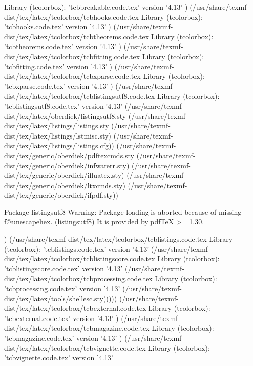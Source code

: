 Library (tcolorbox): 'tcbbreakable.code.tex' version '4.13'
) (/usr/share/texmf-dist/tex/latex/tcolorbox/tcbhooks.code.tex
Library (tcolorbox): 'tcbhooks.code.tex' version '4.13'
) (/usr/share/texmf-dist/tex/latex/tcolorbox/tcbtheorems.code.tex
Library (tcolorbox): 'tcbtheorems.code.tex' version '4.13'
) (/usr/share/texmf-dist/tex/latex/tcolorbox/tcbfitting.code.tex
Library (tcolorbox): 'tcbfitting.code.tex' version '4.13'
) (/usr/share/texmf-dist/tex/latex/tcolorbox/tcbxparse.code.tex
Library (tcolorbox): 'tcbxparse.code.tex' version '4.13'
) (/usr/share/texmf-dist/tex/latex/tcolorbox/tcblistingsutf8.code.tex
Library (tcolorbox): 'tcblistingsutf8.code.tex' version '4.13'
(/usr/share/texmf-dist/tex/latex/oberdiek/listingsutf8.sty
(/usr/share/texmf-dist/tex/latex/listings/listings.sty
(/usr/share/texmf-dist/tex/latex/listings/lstmisc.sty)
(/usr/share/texmf-dist/tex/latex/listings/listings.cfg))
(/usr/share/texmf-dist/tex/generic/oberdiek/pdftexcmds.sty
(/usr/share/texmf-dist/tex/generic/oberdiek/infwarerr.sty)
(/usr/share/texmf-dist/tex/generic/oberdiek/ifluatex.sty)
(/usr/share/texmf-dist/tex/generic/oberdiek/ltxcmds.sty)
(/usr/share/texmf-dist/tex/generic/oberdiek/ifpdf.sty))

Package listingsutf8 Warning: Package loading is aborted because of missing \pd
f@unescapehex.
(listingsutf8)                It is provided by pdfTeX >= 1.30.

) (/usr/share/texmf-dist/tex/latex/tcolorbox/tcblistings.code.tex
Library (tcolorbox): 'tcblistings.code.tex' version '4.13'
(/usr/share/texmf-dist/tex/latex/tcolorbox/tcblistingscore.code.tex
Library (tcolorbox): 'tcblistingscore.code.tex' version '4.13'
(/usr/share/texmf-dist/tex/latex/tcolorbox/tcbprocessing.code.tex
Library (tcolorbox): 'tcbprocessing.code.tex' version '4.13'
(/usr/share/texmf-dist/tex/latex/tools/shellesc.sty)))))
(/usr/share/texmf-dist/tex/latex/tcolorbox/tcbexternal.code.tex
Library (tcolorbox): 'tcbexternal.code.tex' version '4.13'
) (/usr/share/texmf-dist/tex/latex/tcolorbox/tcbmagazine.code.tex
Library (tcolorbox): 'tcbmagazine.code.tex' version '4.13'
) (/usr/share/texmf-dist/tex/latex/tcolorbox/tcbvignette.code.tex
Library (tcolorbox): 'tcbvignette.code.tex' version '4.13'

